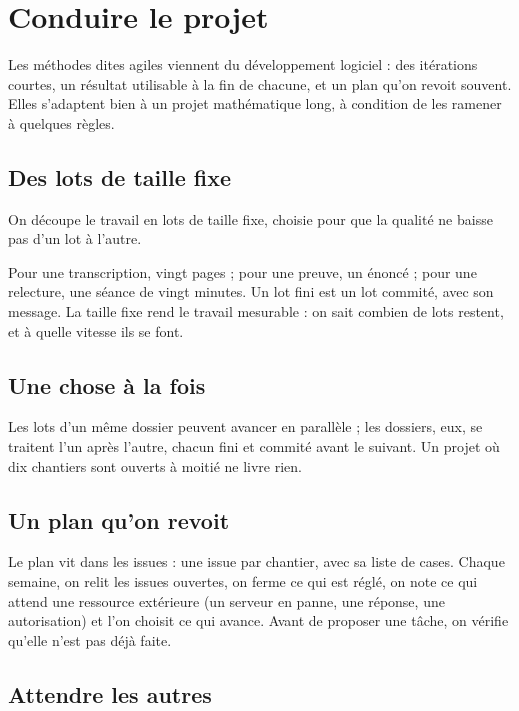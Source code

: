 \chapter{Conduire le projet}

Les méthodes dites agiles viennent du développement logiciel : des itérations courtes, un
résultat utilisable à la fin de chacune, et un plan qu'on revoit souvent. Elles
s'adaptent bien à un projet mathématique long, à condition de les ramener à quelques règles.

\section{Des lots de taille fixe}

\begin{regle}
On découpe le travail en lots de taille fixe, choisie pour que la qualité ne baisse pas
d'un lot à l'autre.
\end{regle}

Pour une transcription, vingt pages ; pour une preuve, un énoncé ; pour une relecture, une
séance de vingt minutes. Un lot fini est un lot commité, avec son message. La taille fixe
rend le travail mesurable : on sait combien de lots restent, et à quelle vitesse ils se
font.

\section{Une chose à la fois}

Les lots d'un même dossier peuvent avancer en parallèle ; les dossiers, eux, se traitent
l'un après l'autre, chacun fini et commité avant le suivant. Un projet où dix chantiers
sont ouverts à moitié ne livre rien.

\section{Un plan qu'on revoit}

Le plan vit dans les issues : une issue par chantier, avec sa liste de cases. Chaque
semaine, on relit les issues ouvertes, on ferme ce qui est réglé, on note ce qui attend une
ressource extérieure (un serveur en panne, une réponse, une autorisation) et l'on choisit
ce qui avance. Avant de proposer une tâche, on vérifie qu'elle n'est pas déjà faite.

\section{Attendre les autres}

